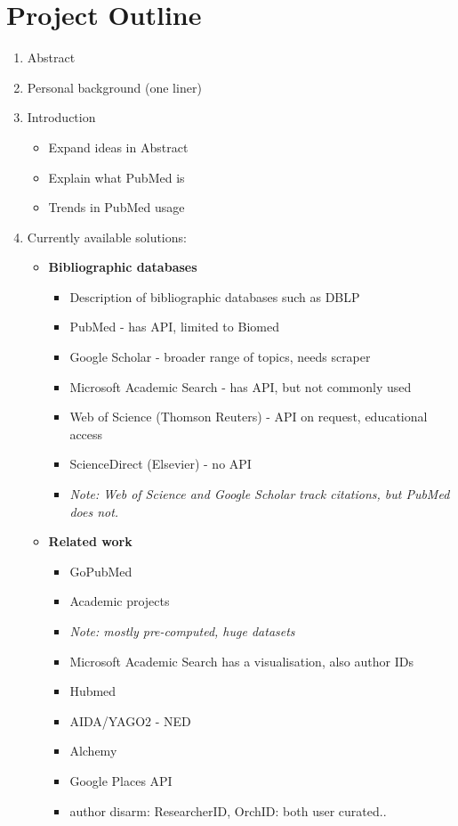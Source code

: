 \documentclass[a4paper,12pt]{article}
\begin{document}
\section{Project Outline}
\begin{enumerate}
	\item Abstract
	\item Personal background (one liner)
	\item Introduction
	\begin{itemize}
		\item Expand ideas in Abstract
		\item Explain what PubMed is
		\item Trends in PubMed usage
		\end{itemize}
	\item Currently available solutions:
	\begin{itemize}
		\item \textbf{Bibliographic databases}
		\begin{itemize}
			\item Description of bibliographic databases such as DBLP
			\item PubMed - has API, limited to Biomed
			\item Google Scholar - broader range of topics, needs scraper
			\item Microsoft Academic Search - has API, but not commonly used
			\item Web of Science (Thomson Reuters) - API on request, educational access
			\item ScienceDirect (Elsevier) - no API
			\item \emph{Note: Web of Science and Google Scholar track citations, but PubMed does not.}
		\end{itemize}
		\item \textbf{Related work}
		\begin{itemize}
			\item GoPubMed
			\item Academic projects 
			\item \emph{Note: mostly pre-computed, huge datasets}
			\item Microsoft Academic Search has a visualisation, also author IDs
			\item Hubmed
			\item AIDA/YAGO2 - NED
			\item Alchemy
			\item Google Places API
			\item author disarm: ResearcherID, OrchID: both user curated..

\end{itemize}
\end{itemize}
\end{enumerate}
\end{document}
